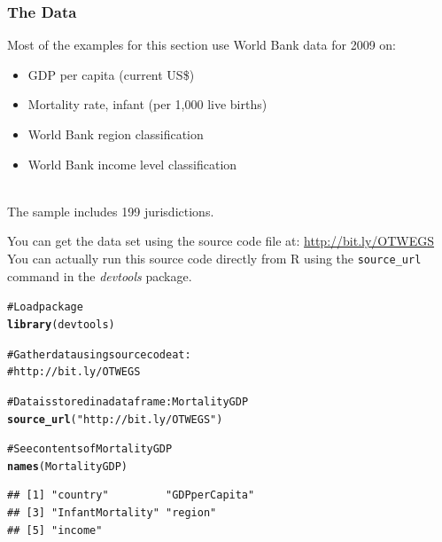 \documentclass{beamer}\usepackage{graphicx, color}
\makeatletter
\newcommand{\hlfunctioncall}[1]{\textcolor[rgb]{0.501960784313725,0,0.329411764705882}{\textbf{#1}}}%
\newcommand{\hlstring}[1]{\textcolor[rgb]{0.6,0.6,1}{#1}}%
\newcommand{\hlcomment}[1]{\textcolor[rgb]{0.180392156862745,0.6,0.341176470588235}{#1}}%
\newenvironment{kframe}{%
 \def\at@end@of@kframe{}%
 \ifinner\ifhmode%
  \def\at@end@of@kframe{\end{minipage}}%
  \begin{minipage}{\columnwidth}%
 \fi\fi%
 \def\FrameCommand##1{\hskip\@totalleftmargin \hskip-\fboxsep
 \colorbox{shadecolor}{##1}\hskip-\fboxsep
     \hskip-\linewidth \hskip-\@totalleftmargin \hskip\columnwidth}%
 \MakeFramed {\advance\hsize-\width
   \@totalleftmargin\z@ \linewidth\hsize
   \@setminipage}}%
 {\par\unskip\endMakeFramed%
 \at@end@of@kframe}
\newenvironment{knitrout}{}{} %
\makeatother
\begin{document}


\begin{frame}[fragile]
  \frametitle{The Data}
  Most of the examples for this section use World Bank data for 2009 on:
  \begin{itemize}
    \item GDP per capita (current US\$)
    \item Mortality rate, infant (per 1,000 live births)
    \item World Bank region classification
    \item World Bank income level classification
  \end{itemize} \\[0.3cm]
  The sample includes 199 jurisdictions.
\end{frame}

\begin{frame}[fragile]
  You can get the data set using the source code file at: \url{http://bit.ly/OTWEGS} \\[0.5cm]
  You can actually run this source code directly from R using the \texttt{source\_url} command in the {\emph{devtools}} package.
\end{frame}

\begin{frame}[fragile]
\begin{knitrout}
\color{fgcolor}\begin{kframe}
\begin{alltt}
\hlcomment{# Load package}
\hlfunctioncall{library}(devtools)

\hlcomment{# Gather data using source code at:}
\hlcomment{# http://bit.ly/OTWEGS}

\hlcomment{# Data is stored in a data frame: MortalityGDP}
\hlfunctioncall{source_url}(\hlstring{"http://bit.ly/OTWEGS"})

\hlcomment{# See contents of MortalityGDP}
\hlfunctioncall{names}(MortalityGDP)
\end{alltt}
\begin{verbatim}
## [1] "country"         "GDPperCapita"   
## [3] "InfantMortality" "region"         
## [5] "income"
\end{verbatim}
\end{kframe}
\end{knitrout}

\end{frame}
\end{document}
